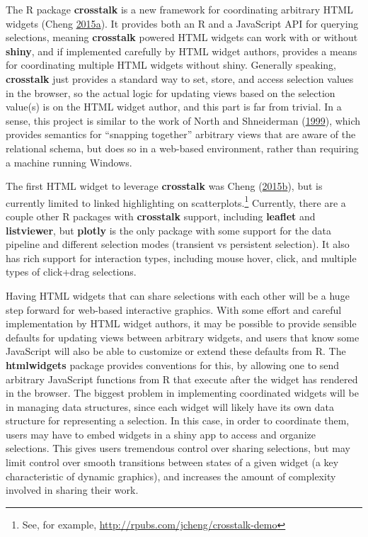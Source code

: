 \documentclass[12pt,]{isuthesis}
\let\rmarkdownfootnote\footnote%
\def\footnote{\protect\rmarkdownfootnote}
\begin{document}
The R package \textbf{crosstalk} is a new framework for coordinating
arbitrary HTML widgets (Cheng
\protect\hyperlink{ref-crosstalk}{2015}\protect\hyperlink{ref-crosstalk}{a}).
It provides both an R and a JavaScript API for querying selections,
meaning \textbf{crosstalk} powered HTML widgets can work with or without
\textbf{shiny}, and if implemented carefully by HTML widget authors,
provides a means for coordinating multiple HTML widgets without shiny.
Generally speaking, \textbf{crosstalk} just provides a standard way to
set, store, and access selection values in the browser, so the actual
logic for updating views based on the selection value(s) is on the HTML
widget author, and this part is far from trivial. In a sense, this
project is similar to the work of North and Shneiderman
(\protect\hyperlink{ref-North:1999vi}{1999}), which provides semantics
for ``snapping together'' arbitrary views that are aware of the
relational schema, but does so in a web-based environment, rather than
requiring a machine running Windows.

The first HTML widget to leverage \textbf{crosstalk} was Cheng
(\protect\hyperlink{ref-d3scatter}{2015}\protect\hyperlink{ref-d3scatter}{b}),
but is currently limited to linked highlighting on
scatterplots.\footnote{See, for example,
  \url{http://rpubs.com/jcheng/crosstalk-demo}} Currently, there are a
couple other R packages with \textbf{crosstalk} support, including
\textbf{leaflet} and \textbf{listviewer}, but \textbf{plotly} is the
only package with some support for the data pipeline and different
selection modes (transient vs persistent selection). It also has rich
support for interaction types, including mouse hover, click, and
multiple types of click+drag selections.

Having HTML widgets that can share selections with each other will be a
huge step forward for web-based interactive graphics. With some effort
and careful implementation by HTML widget authors, it may be possible to
provide sensible defaults for updating views between arbitrary widgets,
and users that know some JavaScript will also be able to customize or
extend these defaults from R. The \textbf{htmlwidgets} package provides
conventions for this, by allowing one to send arbitrary JavaScript
functions from R that execute after the widget has rendered in the
browser. The biggest problem in implementing coordinated widgets will be
in managing data structures, since each widget will likely have its own
data structure for representing a selection. In this case, in order to
coordinate them, users may have to embed widgets in a shiny app to
access and organize selections. This gives users tremendous control over
sharing selections, but may limit control over smooth transitions
between states of a given widget (a key characteristic of dynamic
graphics), and increases the amount of complexity involved in sharing
their work.
\end{document}
